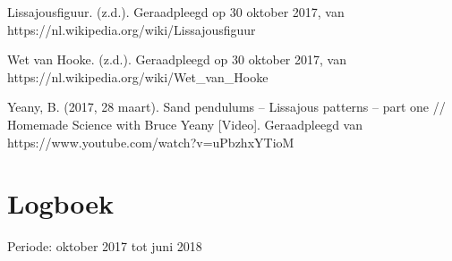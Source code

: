 \documentclass[a4paper]{article}
\begin{document}
	\begin{thebibliography}{9}
		
		Lissajousfiguur. (z.d.). Geraadpleegd op 30 oktober 2017, van https://nl.wikipedia.org/wiki/Lissajousfiguur
		
		Wet van Hooke. (z.d.). Geraadpleegd op 30 oktober 2017, van https://nl.wikipedia.org/wiki/Wet\_van\_Hooke
		
		Yeany, B. (2017, 28 maart). Sand pendulums – Lissajous patterns – part one // Homemade Science with Bruce Yeany [Video]. Geraadpleegd van https://www.youtube.com/watch?v=uPbzhxYTioM
		
	\end{thebibliography}


	\clearpage
	\section{Logboek}
	Periode: oktober 2017 tot juni 2018
\end{document}
